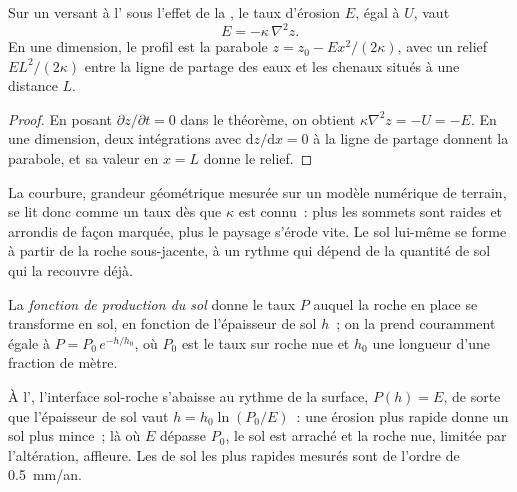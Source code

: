 \begin{proposition}\label{prop:b3:quantitative-geomorphology:curvature}
Sur un versant à l' sous l'effet de la , le taux d'érosion
$E$, égal à $U$, vaut
\[
E = -\kappa\,\nabla^2 z .
\]
En une dimension, le profil est la parabole $z = z_0 - E x^2/(2\kappa)$,
avec un relief $E L^2/(2\kappa)$ entre la ligne de partage des eaux et les chenaux
situés à une distance $L$.
\end{proposition}

\begin{proof}
En posant $\partial z/\partial t = 0$ dans le théorème, on obtient $\kappa\nabla^2 z =
-U = -E$. En une dimension, deux intégrations avec $\mathrm{d}z/\mathrm{d}x =
0$ à la ligne de partage donnent la parabole, et sa valeur en $x = L$ donne le relief.
\end{proof}

La courbure, grandeur géométrique mesurée sur un modèle numérique de terrain, se lit donc
comme un taux dès que $\kappa$ est connu~: plus les sommets sont raides et arrondis
de façon marquée, plus le paysage s'érode vite. Le sol lui-même se forme à partir
de la roche sous-jacente, à un rythme qui dépend de la quantité de sol qui la recouvre déjà.

\begin{definition}\label{def:b3:quantitative-geomorphology:soil-production}
La \emph{fonction de production du sol} donne
le taux $P$ auquel la roche en place se transforme en sol, en fonction de
l'épaisseur de sol $h$~; on la prend couramment égale à $P = P_0\,e^{-h/h_0}$, où
$P_0$ est le taux sur roche nue et $h_0$ une longueur d'une fraction de mètre.
\end{definition}

À l', l'interface sol-roche s'abaisse au rythme de la
surface, $P(h) = E$, de sorte que l'épaisseur de sol vaut $h = h_0 \ln(P_0/E)$~: une érosion
plus rapide donne un sol plus mince~; là où $E$ dépasse $P_0$, le sol est
arraché et la roche nue, limitée par l'altération, affleure. Les  de sol les plus rapides
mesurés sont de l'ordre de \qty{0.5}{mm/an}.

